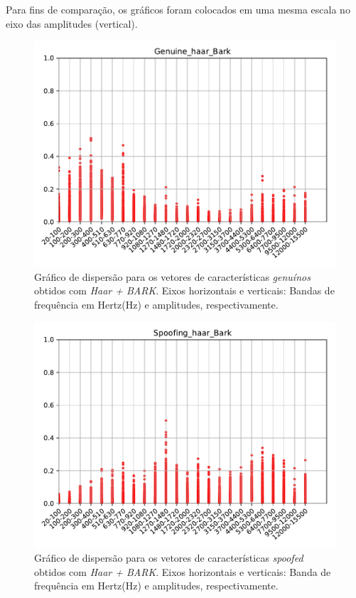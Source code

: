 		\par Para fins de comparação, os gráficos foram colocados em uma mesma escala no eixo das amplitudes (vertical).
		\begin{figure}[H]
			\centering
			\includegraphics[scale=.8]{images/results/barkVersusMel/Genuine_haar_Bark.pdf}
			\caption{Gráfico de dispersão para os vetores de características \textit{genuínos} obtidos com \textit{Haar + BARK}. Eixos horizontais e verticais: Bandas de frequência em Hertz(Hz) e amplitudes, respectivamente.}
			\label{fig:livehaarbark}
		\end{figure}
		\begin{figure}[H]
			\centering
			\includegraphics[scale=.8]{images/results/barkVersusMel/Spoofing_haar_Bark.pdf}
			\caption{Gráfico de dispersão para os vetores de características \textit{spoofed} obtidos com \textit{Haar + BARK}. Eixos horizontais e verticais: Banda de frequência em Hertz(Hz) e amplitudes, respectivamente.}
			\label{fig:spoofinghaarbark}
		\end{figure}
